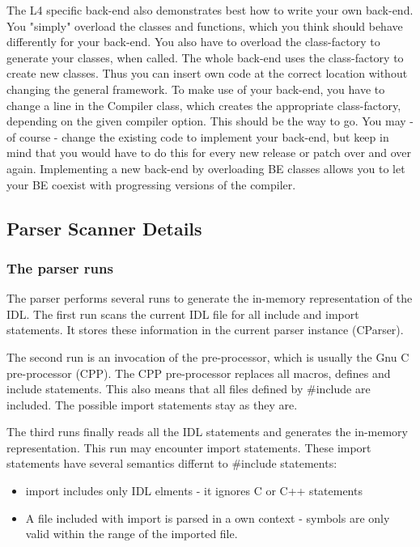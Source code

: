 The L4 specific back-end also demonstrates best how to write your own
back-end. You "simply" overload the classes and functions, which you
think should behave differently for your back-end. You also have to
overload the class-factory to generate your classes, when called. The
whole back-end uses the class-factory to create new classes. Thus you
can insert own code at the correct location without changing the
general framework. To make use of your back-end, you have to change a
line in the Compiler class, which creates the appropriate
class-factory, depending on the given compiler option. This should be
the way to go. You may - of course - change the existing code to
implement your back-end, but keep in mind that you would have to do
this for every new release or patch over and over again. Implementing
a new back-end by overloading BE classes allows you to let your BE
coexist with progressing versions of the compiler.

\subsection{Parser Scanner Details}

\subsubsection{The parser runs}

The parser performs several runs to generate the in-memory
representation of the IDL. The first run scans the current IDL file
for all include and import statements. It stores these information in
the current parser instance (CParser).

The second run is an invocation of the pre-processor, which is usually
the Gnu C pre-processor (CPP). The CPP pre-processor replaces all
macros, defines and include statements. This also means that all files
defined by #include are included. The possible import statements stay
as they are.

The third runs finally reads all the IDL statements and generates the
in-memory representation. This run may encounter import
statements. These import statements have several semantics differnt to
#include statements:

\begin{itemize}
\item
	import includes only IDL elments - it ignores C or C++
	statements
\item
	A file included with import is parsed in a own context -
	symbols are only valid within the range of the imported file.
\end{itemize}

